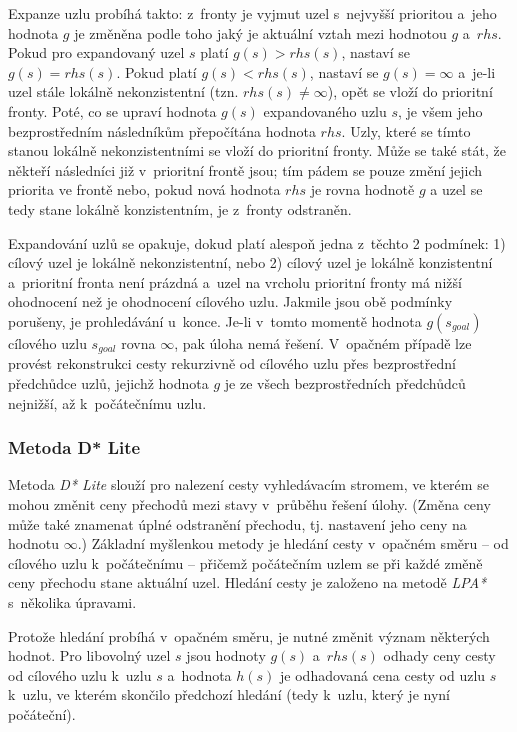 Expanze uzlu probíhá takto: z~fronty je vyjmut uzel s~nejvyšší prioritou a~jeho hodnota $g$ je změněna podle toho jaký je aktuální vztah mezi hodnotou $g$ a~$rhs$. Pokud pro expandovaný uzel $s$ platí $g(s) > rhs(s)$, nastaví se $g(s) = rhs(s)$. Pokud platí $g(s) < rhs(s)$, nastaví se $g(s) = \infty$ a~je-li uzel stále lokálně nekonzistentní (tzn. $rhs(s) \neq \infty$), opět se vloží do prioritní fronty. Poté, co se upraví hodnota $g(s)$ expandovaného uzlu $s$, je všem jeho bezprostředním následníkům přepočítána hodnota $rhs$. Uzly, které se tímto stanou lokálně nekonzistentními se vloží do prioritní fronty. Může se také stát, že někteří následníci již v~prioritní frontě jsou; tím pádem se pouze změní jejich priorita ve frontě nebo, pokud nová hodnota $rhs$ je rovna hodnotě $g$ a uzel se tedy stane lokálně konzistentním, je z~fronty odstraněn.

Expandování uzlů se opakuje, dokud platí alespoň jedna z~těchto 2 podmínek: 1) cílový uzel je lokálně nekonzistentní, nebo 2) cílový uzel je lokálně konzistentní a~prioritní fronta není prázdná a~uzel na vrcholu prioritní fronty má nižší ohodnocení než je ohodnocení cílového uzlu. Jakmile jsou obě podmínky porušeny, je prohledávání u~konce. Je-li v~tomto momentě hodnota $g(s_{goal})$ cílového uzlu $s_{goal}$ rovna $\infty$, pak úloha nemá řešení. V~opačném případě lze provést rekonstrukci cesty rekurzivně od cílového uzlu přes bezprostřední předchůdce uzlů, jejichž hodnota $g$ je ze všech bezprostředních předchůdců nejnižší, až k~počátečnímu uzlu.

\subsubsection*{Metoda D* Lite}

Metoda \emph{D* Lite} \cite{D_star_lite} slouží pro nalezení cesty vyhledávacím stromem, ve kterém se mohou změnit ceny přechodů mezi stavy v~průběhu řešení úlohy. (Změna ceny může také znamenat úplné odstranění přechodu, tj. nastavení jeho ceny na hodnotu $\infty$.) Základní myšlenkou metody je hledání cesty v~opačném směru -- od cílového uzlu k~počátečnímu -- přičemž počátečním uzlem se při každé změně ceny přechodu stane aktuální uzel. Hledání cesty je založeno na metodě \emph{LPA*} s~několika úpravami.

Protože hledání probíhá v~opačném směru, je nutné změnit význam některých hodnot. Pro libovolný uzel $s$ jsou hodnoty $g(s)$ a~$rhs(s)$ odhady ceny cesty od cílového uzlu k~uzlu $s$ a~hodnota $h(s)$ je odhadovaná cena cesty od uzlu $s$ k~uzlu, ve kterém skončilo předchozí hledání (tedy k~uzlu, který je nyní počáteční).

